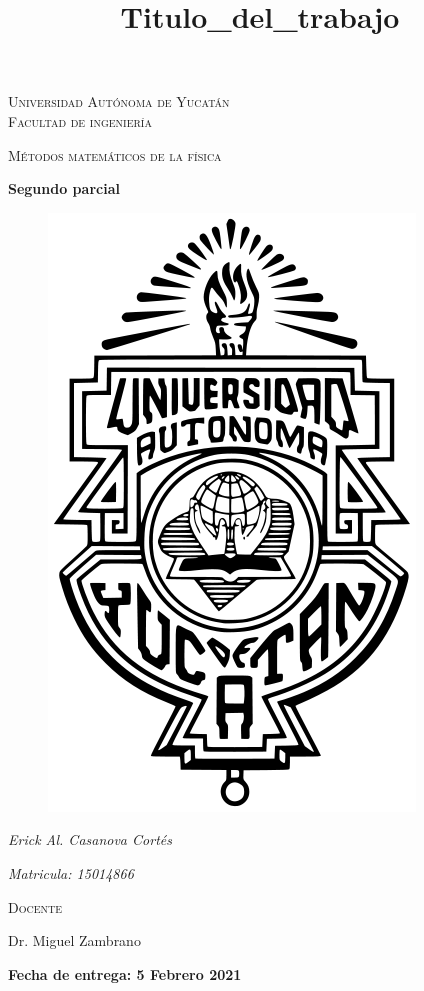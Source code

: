\documentclass[11pt]{report}
\theoremstyle{plain}
\theoremstyle{definition}
\begin{document}
\begin{titlepage}
\title{Titulo_del_trabajo}


	\centering
	{\scshape\LARGE Universidad Autónoma de Yucatán  \\ Facultad de ingeniería\par}
	\vspace{1cm}
	{\scshape\Large Métodos matemáticos de la física\par}
	\vspace{1.5cm}
	{\huge\bfseries Segundo parcial\par}
	\vspace{0.7cm}
	{\begin{figure}[!h]
	\centering
    \includegraphics[scale=0.3]{UADY.png}
	\end{figure}}
	\vspace{0.7cm}
	{\Large\itshape Erick Al. Casanova Cortés\par}
	{\Large\itshape Matricula: 15014866\par}
	\vfill
	{\scshape\Large Docente\par
	Dr. Miguel Zambrano\par}
	\vfill
	{\Large{\bfseries Fecha de entrega: 5 Febrero 2021} }

	\vfill
	
\end{titlepage}
\end{document}
